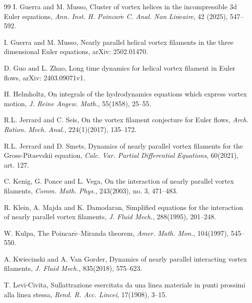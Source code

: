 \documentclass[12pt,reqno]{amsart}
\numberwithin{equation}{section}
\theoremstyle{definition}
\theoremstyle{remark}
\begin{document}
\begin{thebibliography}{99}
I. Guerra and M. Musso, Cluster of vortex helices in the incompressible 3d Euler equations, \textit{Ann. Inst. H. Poincar$\acute{\text{e}}$ C. Anal. Non Lin$\acute{\text{e}}$aire}, 42 (2025), 547--592.

I. Guerra and M. Musso, Nearly parallel helical vortex filaments in the three dimensional Euler equations, arXiv: 2502.01470.


D. Guo  and L. Zhao, Long time dynamics for helical vortex filament in Euler flows, arXiv: 2403.09071v1.


H. Helmholtz, On integrals of the hydrodynamics equations which express vortex motion, \textit{J. Reine Angew. Math.}, 55(1858), 25--55.


R.L. Jerrard and C. Seis, On the vortex filament conjecture for Euler flows, \textit{Arch. Ration. Mech. Anal.}, 224(1)(2017), 135--172.

R.L. Jerrard and D. Smets, Dynamics of nearly parallel vortex filaments for the Gross-Pitaevskii equation, \textit{Calc. Var. Partial Differential Equations}, 60(2021), art. 127.


C. Kenig, G. Ponce and L. Vega, On the interaction of nearly parallel vortex filaments, \textit{Comm. Math. Phys.}, 243(2003), no. 3, 471--483.

R. Klein, A. Majda and K. Damodaran, Simplified equations for the interaction of nearly parallel
vortex filaments, \textit{J. Fluid Mech.}, 288(1995), 201--248.


W. Kulpa, The Poincar$\acute{\text{e}}$--Miranda theorem, \textit{Amer. Math. Mon.},  104(1997), 545--550.

A. Kwiecinski  and  A. Van Gorder, Dynamics of nearly parallel interacting
vortex filaments, \textit{J. Fluid Mech.}, 835(2018),  575--623.

T. Levi-Civita, Sullattrazione esercitata da una linea materiale in punti prossimi alla linea stessa, \textit{Rend. R. Acc. Lincei}, 17(1908), 3--15.


\end{thebibliography}
\end{document}
